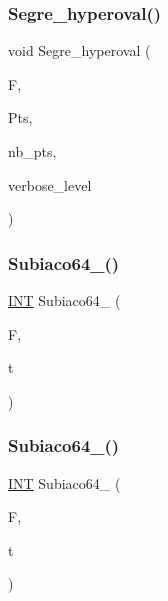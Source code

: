\mbox{\label{data_8_c_a71cde4cf294cb8d65f432797a4384f2f}} 
\subsubsection{\texorpdfstring{Segre\+\_\+hyperoval()}{Segre\_hyperoval()}}
{\footnotesize\ttfamily void Segre\+\_\+hyperoval (\begin{DoxyParamCaption}\item[{\mbox{\hyperlink{classfinite__field}{finite\+\_\+field}} $\ast$}]{F,  }\item[{\mbox{\hyperlink{galois_8h_a09fddde158a3a20bd2dcadb609de11dc}{I\+NT}} $\ast$\&}]{Pts,  }\item[{\mbox{\hyperlink{galois_8h_a09fddde158a3a20bd2dcadb609de11dc}{I\+NT}} \&}]{nb\+\_\+pts,  }\item[{\mbox{\hyperlink{galois_8h_a09fddde158a3a20bd2dcadb609de11dc}{I\+NT}}}]{verbose\+\_\+level }\end{DoxyParamCaption})}

\mbox{\label{data_8_c_a81c9d625873c33beaca31140fa4f05a1}} 
\subsubsection{\texorpdfstring{Subiaco64\+\_()}{Subiaco64\_1()}}
{\footnotesize\ttfamily \mbox{\hyperlink{galois_8h_a09fddde158a3a20bd2dcadb609de11dc}{I\+NT}} Subiaco64\+\_ (\begin{DoxyParamCaption}\item[{\mbox{\hyperlink{classfinite__field}{finite\+\_\+field}} $\ast$}]{F,  }\item[{\mbox{\hyperlink{galois_8h_a09fddde158a3a20bd2dcadb609de11dc}{I\+NT}}}]{t }\end{DoxyParamCaption})}

\mbox{\label{data_8_c_ad202720f26f6d2acbfa564b995e612ee}} 
\subsubsection{\texorpdfstring{Subiaco64\+\_()}{Subiaco64\_2()}}
{\footnotesize\ttfamily \mbox{\hyperlink{galois_8h_a09fddde158a3a20bd2dcadb609de11dc}{I\+NT}} Subiaco64\+\_ (\begin{DoxyParamCaption}\item[{\mbox{\hyperlink{classfinite__field}{finite\+\_\+field}} $\ast$}]{F,  }\item[{\mbox{\hyperlink{galois_8h_a09fddde158a3a20bd2dcadb609de11dc}{I\+NT}}}]{t }\end{DoxyParamCaption})}

